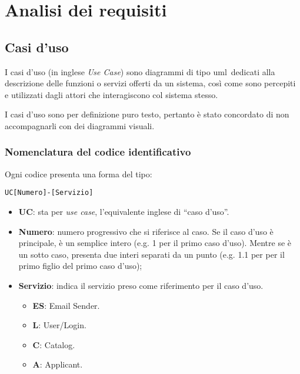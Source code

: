 
\chapter{Analisi dei requisiti}
\label{cap:analisi-requisiti}


\section{Casi d'uso}

I casi d'uso (in inglese \emph{Use Case}) sono diagrammi di tipo \gls{uml}\gloss\ dedicati alla descrizione delle funzioni o servizi offerti da un sistema, così come sono percepiti e utilizzati dagli attori che interagiscono col sistema stesso.

I casi d'uso sono per definizione puro testo, pertanto è stato concordato di non accompagnarli con dei diagrammi visuali.

\subsection{Nomenclatura del codice identificativo}

Ogni codice presenta una forma del tipo:

\begin{center}
	\texttt{UC[Numero]-[Servizio]}
\end{center}

\begin{itemize}
	\item \textbf{UC}: sta per \textit{use case}, l'equivalente inglese di ``caso d'uso''.
	\item \textbf{Numero}: numero progressivo che si riferisce al caso. Se il caso d'uso è principale, è un semplice intero (e.g. 1 per il primo caso d'uso). Mentre se è un sotto caso, presenta due interi separati da un punto (e.g. 1.1 per per il primo figlio del primo caso d'uso);
	\item \textbf{Servizio}: indica il servizio preso come riferimento per il caso d'uso.
	\begin{itemize}
		\item \textbf{ES}: Email Sender.
		\item \textbf{L}: User/Login.
		\item \textbf{C}: Catalog.
		\item \textbf{A}: Applicant.
	\end{itemize}
\end{itemize}

